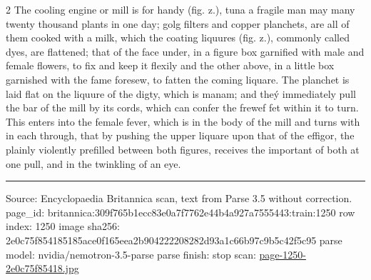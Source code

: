 \documentclass[10pt]{article}
\begin{document}
\begin{multicols}{2}
The cooling engine or mill is for handy (fig. z.), tuna a fragile man may many twenty thousand plants in one day; golg filters and copper planchets, are all of them cooked with a milk, which the coating liquures (fig. z.), commonly called dyes, are flattened; that of the face under, in a figure box garnified with male and female flowers, to fix and keep it flexily and the other above, in a little box garnished with the fame foresew, to fatten the coming liquare. The planchet is laid flat on the liquure of the digty, which is manam; and theý immediately pull the bar of the mill by its cords, which can confer the frewef fet within it to turn. This enters into the female fever, which is in the body of the mill and turns with in each through, that by pushing the upper liquare upon that of the effigor, the plainly violently prefilled between both figures, receives the important of both at one pull, and in the twinkling of an eye.

\end{multicols}
\vfill\par\noindent\rule{\linewidth}{0.4pt}\par
{\scriptsize\color{gray}\noindent Source: Encyclopaedia Britannica scan, text from Parse 3.5 without correction. page\_id: britannica:309f765b1ecc83e0a7f7762e44b4a927a7555443:train:1250 \quad row index: 1250 \quad image sha256: 2e0c75f854185185ace0f165eea2b904222208282d93a1c66b97c9b5c42f5c95 \quad parse model: nvidia/nemotron-3.5-parse \quad parse finish: stop \quad scan: \href{../scans/page-1250-2e0c75f85418.jpg}{page-1250-2e0c75f85418.jpg}\par}
\end{document}
